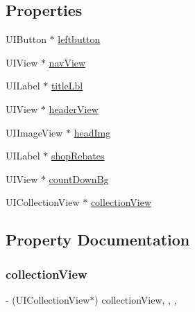 \subsection*{Properties}
\begin{DoxyCompactItemize}
\item 
U\+I\+Button $\ast$ \mbox{\hyperlink{category_will_sales_view_controller_07_08_ac9419f159cd49db3bb3e1ff54e30098a}{leftbutton}}
\item 
U\+I\+View $\ast$ \mbox{\hyperlink{category_will_sales_view_controller_07_08_ab8b3ec19af037409e10c6efa58c7e0ed}{nav\+View}}
\item 
U\+I\+Label $\ast$ \mbox{\hyperlink{category_will_sales_view_controller_07_08_a6f640f60ce55012f5b1839b5ef5ab01b}{title\+Lbl}}
\item 
U\+I\+View $\ast$ \mbox{\hyperlink{category_will_sales_view_controller_07_08_a932338a20b4813ebe36d1157652c98ce}{header\+View}}
\item 
U\+I\+Image\+View $\ast$ \mbox{\hyperlink{category_will_sales_view_controller_07_08_a6c4d66bf8b06e63700a3c72b2b782ddd}{head\+Img}}
\item 
U\+I\+Label $\ast$ \mbox{\hyperlink{category_will_sales_view_controller_07_08_a54902659c56f502db18380ec00a04ce4}{shop\+Rebates}}
\item 
U\+I\+View $\ast$ \mbox{\hyperlink{category_will_sales_view_controller_07_08_a06af413c032656fec8e8d719466ebf8c}{count\+Down\+Bg}}
\item 
U\+I\+Collection\+View $\ast$ \mbox{\hyperlink{category_will_sales_view_controller_07_08_ac1570964bd2a4e52ea806205ccb5c3c0}{collection\+View}}
\end{DoxyCompactItemize}


\subsection{Property Documentation}
\mbox{\label{category_will_sales_view_controller_07_08_ac1570964bd2a4e52ea806205ccb5c3c0}} 
\subsubsection{\texorpdfstring{collection\+View}{collectionView}}
{\footnotesize\ttfamily -\/ (U\+I\+Collection\+View$\ast$) collection\+View\hspace{0.3cm}{\ttfamily [read]}, {\ttfamily [write]}, {\ttfamily [nonatomic]}, {\ttfamily [strong]}}

